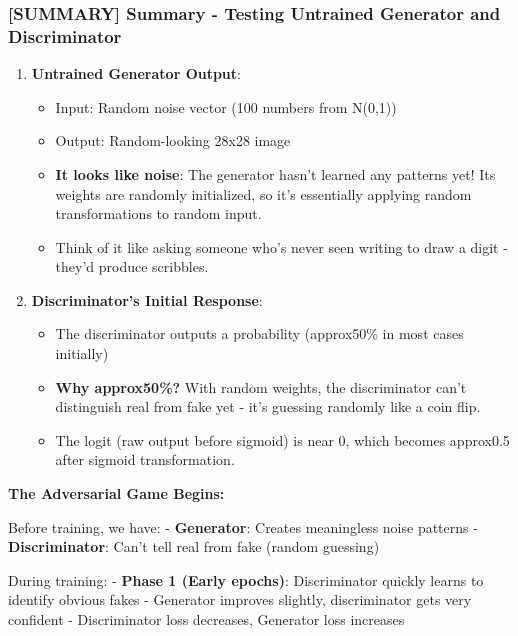 \documentclass[11pt]{article}
\providecommand{\tightlist}{%
      \setlength{\itemsep}{0pt}\setlength{\parskip}{0pt}}
\begin{document}
    \subsubsection{{[}SUMMARY{]} Summary - Testing Untrained Generator and
Discriminator}\label{summary-summary---testing-untrained-generator-and-discriminator}

\begin{enumerate}
\def\labelenumi{\arabic{enumi}.}
\tightlist
\item
  \textbf{Untrained Generator Output}:

  \begin{itemize}
  \tightlist
  \item
    Input: Random noise vector (100 numbers from N(0,1))
  \item
    Output: Random-looking 28x28 image
  \item
    \textbf{It looks like noise}: The generator hasn't learned any
    patterns yet! Its weights are randomly initialized, so it's
    essentially applying random transformations to random input.
  \item
    Think of it like asking someone who's never seen writing to draw a
    digit - they'd produce scribbles.
  \end{itemize}
\item
  \textbf{Discriminator's Initial Response}:

  \begin{itemize}
  \tightlist
  \item
    The discriminator outputs a probability (approx50\% in most cases
    initially)
  \item
    \textbf{Why approx50\%?} With random weights, the discriminator
    can't distinguish real from fake yet - it's guessing randomly like a
    coin flip.
  \item
    The logit (raw output before sigmoid) is near 0, which becomes
    approx0.5 after sigmoid transformation.
  \end{itemize}
\end{enumerate}

\textbf{The Adversarial Game Begins:}

Before training, we have: - \textbf{Generator}: Creates meaningless
noise patterns - \textbf{Discriminator}: Can't tell real from fake
(random guessing)

During training: - \textbf{Phase 1 (Early epochs)}: Discriminator
quickly learns to identify obvious fakes - Generator improves slightly,
discriminator gets very confident - Discriminator loss decreases,
Generator loss increases
\end{document}
